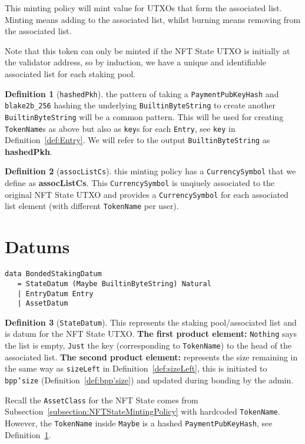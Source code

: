 \documentclass[10pt, a4paper]{article}
\theoremstyle{definition}
\newtheorem{definition}{Definition}[section]
\begin{document}
This minting policy will mint value for UTXOs that form the associated list. Minting means adding to the associated list, whilst burning means removing from the associated list.

Note that this token can only be minted if the NFT State UTXO is initially at the validator address, so by induction, we have a unique and identifiable associated list for each staking pool.

\begin{definition}[\texttt{hashedPkh}]\label{def:hashedPkh} the pattern of taking a \texttt{PaymentPubKeyHash} and \texttt{blake2b\_256} hashing the underlying \texttt{BuiltinByteString} to create another \texttt{BuiltinByteString} will be a common pattern. This will be used for creating \texttt{TokenName}s as above but also as \texttt{key}s for each \texttt{Entry}, see \texttt{key} in Definition~\ref{def:Entry}. We will refer to the output \texttt{BuiltinByteString} as \textbf{hashedPkh}.
\end{definition}

\begin{definition}[\texttt{assocListCs}]\label{def:assocListCs} this minting policy has a \texttt{CurrencySymbol} that we define as \textbf{assocListCs}. This \texttt{CurrencySymbol} is unqiuely associated to the original NFT State UTXO and provides a \texttt{CurrencySymbol} for each associated list element (with different \texttt{TokenName} per user).
\end{definition}

\section{Datums}
\begin{verbatim}
data BondedStakingDatum
   = StateDatum (Maybe BuiltinByteString) Natural
   | EntryDatum Entry
   | AssetDatum

\end{verbatim}

\begin{definition}[\texttt{StateDatum}]\label{def:StateDatum} This represents the staking pool/associated list and is datum for the NFT State UTXO. \textbf{The first product element:} \texttt{Nothing} says the list is empty, \texttt{Just} the key (corresponding to \texttt{TokenName}) to the head of the associated list. \textbf{The second product element:} represents the size remaining in the same way as \texttt{sizeLeft} in Definition~\ref{def:sizeLeft}, this is initiated to \texttt{bpp'size} (Definition~\ref{def:bpp'size}) and updated during bonding by the admin.

Recall the \texttt{AssetClass} for the NFT State comes from Subsection~\ref{subsection:NFTStateMintingPolicy} with hardcoded \texttt{TokenName}. However, the \texttt{TokenName} inside \texttt{Maybe} is a hashed \texttt{PaymentPubKeyHash}, see Definition~\ref{def:hashedPkh}.
\end{definition}
\end{document}
